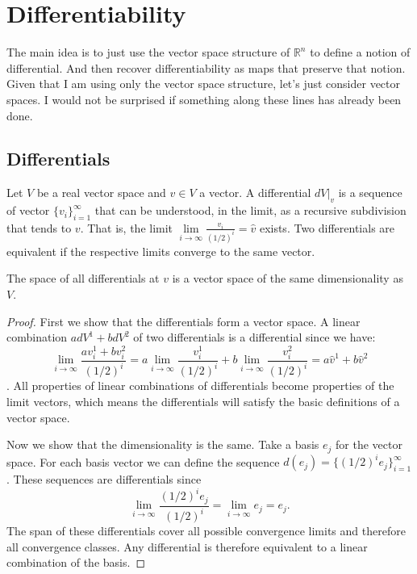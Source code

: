 \chapter{Differentiability}

The main idea is to just use the vector space structure of $\mathbb{R}^n$ to define a notion of differential. And then recover differentiability as maps that preserve that notion. Given that I am using only the vector space structure, let’s just consider vector spaces. I would not be surprised if something along these lines has already been done.

\section{Differentials}

\begin{defn}
Let $V$ be a real vector space and $v \in V$ a vector. A differential $dV|_v$ is a sequence of vector $\{v_i\}_{i=1}^{\infty}$ that can be understood, in the limit, as a recursive subdivision that tends to $v$. That is, the limit $\lim\limits_{i \to \infty} \frac{v_i}{(1/2)^i} = \hat{v}$ exists. Two differentials are equivalent if the respective limits converge to the same vector.
\end{defn}

\begin{prop}
	The space of all differentials at $v$ is a vector space of the same dimensionality as $V$.
\end{prop}

\begin{proof}
	First we show that the differentials form a vector space. A linear combination $a dV^1 + b dV^2$ of two differentials is a differential since we have:
	$$\lim\limits_{i \to \infty} \frac{a v_i^1 + b v_i^2}{(1/2)^i} = a\lim\limits_{i \to \infty} \frac{v_i^1}{(1/2)^i} + b\lim\limits_{i \to \infty} \frac{v_i^2}{(1/2)^i} = a \hat{v}^1 + b \hat{v}^2$$.
	All properties of linear combinations of differentials become properties of the limit vectors, which means the differentials will satisfy the basic definitions of a vector space.
	
	Now we show that the dimensionality is the same. Take a basis $e_j$ for the vector space. For each basis vector we can define the sequence $d(e_j) = \{(1/2)^i e_j\}_{i=1}^{\infty}$. These sequences are differentials since
	$$\lim\limits_{i \to \infty} \frac{(1/2)^i e_j}{(1/2)^i} = \lim\limits_{i \to \infty} e_j = e_j.$$
	The span of these differentials cover all possible convergence limits and therefore all convergence classes. Any differential is therefore equivalent to a linear combination of the basis.
\end{proof}

